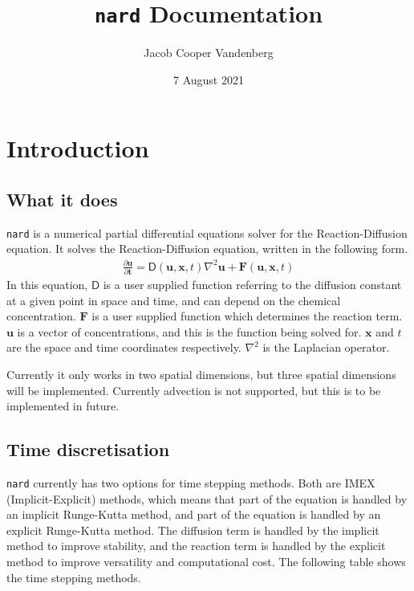 \documentclass[11pt]{article}
\title{\texttt{nard} Documentation}
\author{Jacob Cooper Vandenberg}
\date{7 August 2021}
\begin{document}
    \maketitle
    \tableofcontents


    \section[Introduction]{Introduction}
    \subsection[What it does]{What it does}
    \texttt{nard} is a numerical partial differential equations solver for the Reaction-Diffusion equation.
    It solves the Reaction-Diffusion equation, written in the following form.
    \begin{gather}
        \frac{\partial \mathbf{u} }{\partial \mathbf{t}} = \mathsf{D}(\mathbf{u}, \mathbf{x}, t)\nabla^2 \mathbf{u} + \mathbf{F}(\mathbf{u}, \mathbf{x}, t)
    \end{gather}
    In this equation, \(\mathsf{D}\) is a user supplied function referring to the diffusion constant at a given point in space and time, and can depend on the chemical concentration. \(\mathbf{F}\) is a user supplied function which determines the reaction term. \(\mathbf{u}\) is a vector of concentrations, and this is the function being solved for. \(\mathbf{x}\) and \(t\) are the space and time coordinates respectively. \(\nabla^2\) is the Laplacian operator.

    Currently it only works in two spatial dimensions, but three spatial dimensions will be implemented.
    Currently advection is not supported, but this is to be implemented in future.


    \subsection{Time discretisation}
    \texttt{nard} currently has two options for time stepping methods. Both are IMEX (Implicit-Explicit) methods, which means that part of the equation is handled by an implicit Runge-Kutta method, and part of the equation is handled by an explicit Runge-Kutta method. The diffusion term is handled by the implicit method to improve stability, and the reaction term is handled by the explicit method to improve versatility and computational cost.
    The following table shows the time stepping methods.
\end{document}
